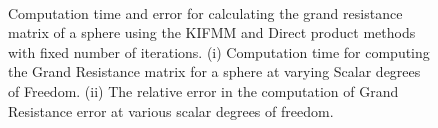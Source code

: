 \begin{figure}[ht]
\begin{subfigure}[b]{0.49\textwidth}
         \caption{\label{fig:NodeCapError}}
     \end{subfigure} \\
        \caption[Computation time and error for calculating the grand resistance matrix of a sphere using the KIFMM and Direct product methods.]{Computation time and error for calculating the grand resistance matrix of a sphere using the KIFMM and Direct product methods with fixed number of iterations. (i) Computation time for computing the Grand Resistance matrix for a sphere at varying Scalar degrees of Freedom. (ii) The relative error in the computation of Grand Resistance error at various scalar degrees of freedom.}
        \label{fig:NodeCap}
\end{figure}

